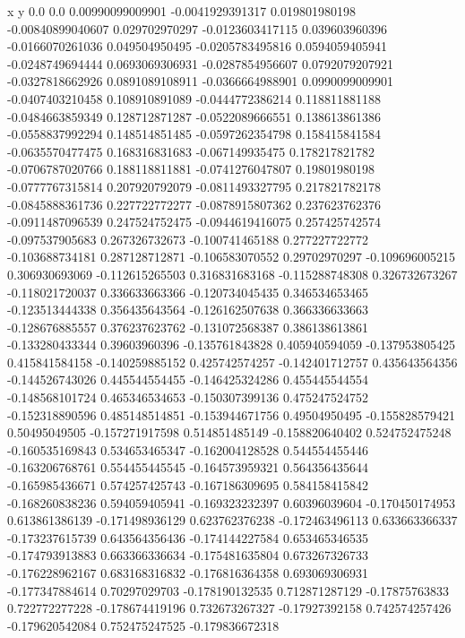               x                y
            0.0              0.0
0.00990099009901  -0.0041929391317
 0.019801980198  -0.00840899040607
 0.029702970297  -0.0123603417115
 0.039603960396  -0.0166070261036
 0.049504950495  -0.0205783495816
0.0594059405941  -0.0248749694444
0.0693069306931  -0.0287854956607
0.0792079207921  -0.0327818662926
0.0891089108911  -0.0366664988901
0.0990099009901  -0.0407403210458
 0.108910891089  -0.0444772386214
 0.118811881188  -0.0484663859349
 0.128712871287  -0.0522089666551
 0.138613861386  -0.0558837992294
 0.148514851485  -0.0597262354798
 0.158415841584  -0.0635570477475
 0.168316831683  -0.067149935475
 0.178217821782  -0.0706787020766
 0.188118811881  -0.0741276047807
  0.19801980198  -0.0777767315814
 0.207920792079  -0.0811493327795
 0.217821782178  -0.0845888361736
 0.227722772277  -0.0878915807362
 0.237623762376  -0.0911487096539
 0.247524752475  -0.0944619416075
 0.257425742574  -0.097537905683
 0.267326732673  -0.100741465188
 0.277227722772  -0.103688734181
 0.287128712871  -0.106583070552
  0.29702970297  -0.109696005215
 0.306930693069  -0.112615265503
 0.316831683168  -0.115288748308
 0.326732673267  -0.118021720037
 0.336633663366  -0.120734045435
 0.346534653465  -0.123513444338
 0.356435643564  -0.126162507638
 0.366336633663  -0.128676885557
 0.376237623762  -0.131072568387
 0.386138613861  -0.133280433344
  0.39603960396  -0.135761843828
 0.405940594059  -0.137953805425
 0.415841584158  -0.140259885152
 0.425742574257  -0.142401712757
 0.435643564356  -0.144526743026
 0.445544554455  -0.146425324286
 0.455445544554  -0.148568101724
 0.465346534653  -0.150307399136
 0.475247524752  -0.152318890596
 0.485148514851  -0.153944671756
  0.49504950495  -0.155828579421
  0.50495049505  -0.157271917598
 0.514851485149  -0.158820640402
 0.524752475248  -0.160535169843
 0.534653465347  -0.162004128528
 0.544554455446  -0.163206768761
 0.554455445545  -0.164573959321
 0.564356435644  -0.165985436671
 0.574257425743  -0.167186309695
 0.584158415842  -0.168260838236
 0.594059405941  -0.169323232397
  0.60396039604  -0.170450174953
 0.613861386139  -0.171498936129
 0.623762376238  -0.172463496113
 0.633663366337  -0.173237615739
 0.643564356436  -0.174144227584
 0.653465346535  -0.174793913883
 0.663366336634  -0.175481635804
 0.673267326733  -0.176228962167
 0.683168316832  -0.176816364358
 0.693069306931  -0.177347884614
  0.70297029703  -0.178190132535
 0.712871287129   -0.17875763833
 0.722772277228  -0.178674419196
 0.732673267327   -0.17927392158
 0.742574257426  -0.179620542084
 0.752475247525  -0.179836672318
